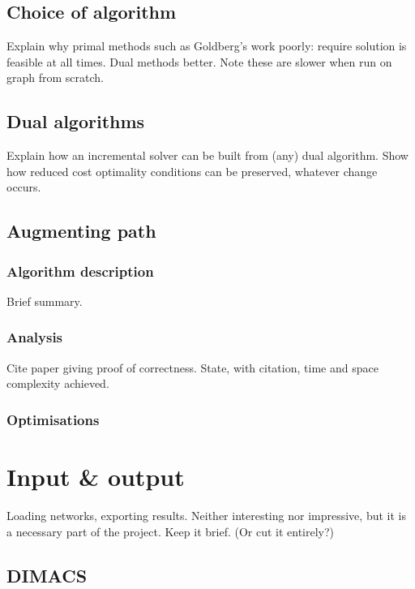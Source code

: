 \subsection{Choice of algorithm}

Explain why primal methods such as Goldberg's work poorly: require solution is feasible at all times. Dual methods better. Note these are slower when run on graph from scratch.

\subsection{Dual algorithms}

Explain how an incremental solver can be built from (any) dual algorithm. Show how reduced cost optimality conditions can be preserved, whatever change occurs.

\subsection{Augmenting path}

\subsubsection{Algorithm description}

Brief summary.

\subsubsection{Analysis}

Cite paper giving proof of correctness. State, with citation, time and space complexity achieved.

\subsubsection{Optimisations}

\section{Input \& output}

Loading networks, exporting results. Neither interesting nor impressive, but it is a necessary part of the project. Keep it brief. (Or cut it entirely?)

\subsection{DIMACS}

